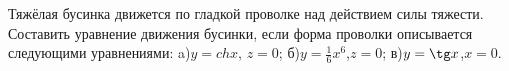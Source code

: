 Тяжёлая бусинка движется по гладкой проволке над действием силы тяжести.
Составить уравнение движения бусинки, если форма проволки описывается
следующими уравнениями: 
a)$y=chx$, $z=0$;
б)$y=\frac{1}{6}x^6$,$z=0$;
в)$y=\tg x$,$x=0$.
